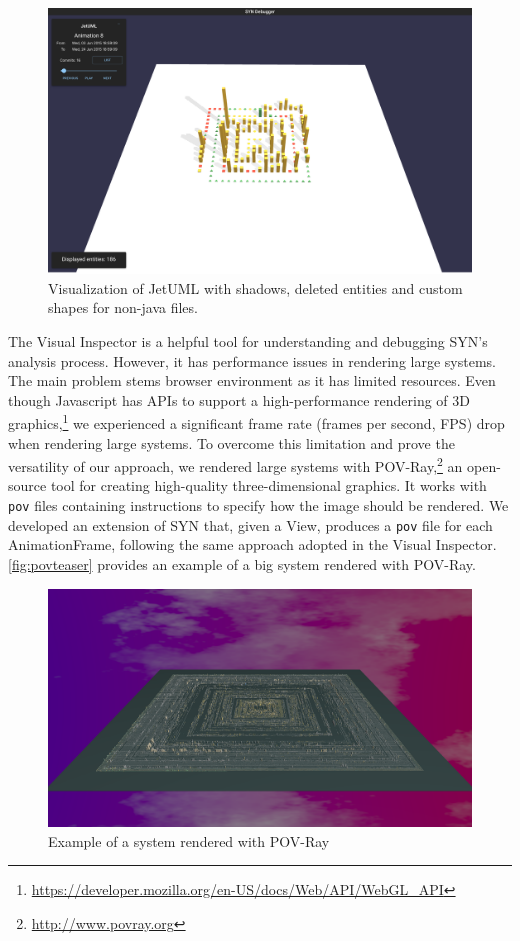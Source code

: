 \begin{figure}
    \center
    \includegraphics[width=\textwidth]{SYNUI-deletedshadow.png}
    \caption{Visualization of JetUML with shadows, deleted entities and custom shapes for non-java files.}
    \label{fig:deletedshadow}
\end{figure}


The Visual Inspector is a helpful tool for understanding and debugging SYN's analysis process. However, it has performance issues in rendering large systems. The main problem stems browser environment as it has limited resources. Even though Javascript has APIs to support a high-performance rendering of 3D graphics,\footnote{\url{https://developer.mozilla.org/en-US/docs/Web/API/WebGL_API}} we experienced a significant frame rate (frames per second, FPS) drop when rendering large systems. To overcome this limitation and prove the versatility of our approach, we rendered large systems with POV-Ray,\footnote{\url{http://www.povray.org}} an open-source tool for creating high-quality three-dimensional graphics. It works with \texttt{pov} files containing instructions to specify how the image should be rendered. We developed an extension of SYN that, given a View, produces a \texttt{pov} file for each AnimationFrame, following the same approach adopted in the Visual Inspector. \autoref{fig:povteaser} provides an example of a big system rendered with POV-Ray.

\begin{figure}
    \center
    \includegraphics[width=\textwidth]{LibreOfficeTeaser.png}
    \caption{Example of a system rendered with POV-Ray}
    \label{fig:povteaser}
\end{figure}

